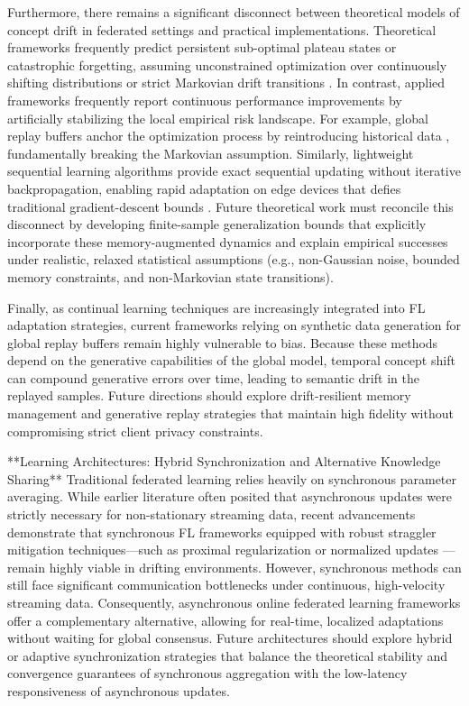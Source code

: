 \documentclass[journal]{IEEEtran}
\begin{document}
Furthermore, there remains a significant disconnect between theoretical models of concept drift in federated settings and practical implementations. Theoretical frameworks frequently predict persistent sub-optimal plateau states or catastrophic forgetting, assuming unconstrained optimization over continuously shifting distributions or strict Markovian drift transitions \cite{Straat2018}. In contrast, applied frameworks frequently report continuous performance improvements by artificially stabilizing the local empirical risk landscape. For example, global replay buffers anchor the optimization process by reintroducing historical data \cite{Miao2025}, fundamentally breaking the Markovian assumption. Similarly, lightweight sequential learning algorithms provide exact sequential updating without iterative backpropagation, enabling rapid adaptation on edge devices that defies traditional gradient-descent bounds \cite{Ito2021}. Future theoretical work must reconcile this disconnect by developing finite-sample generalization bounds that explicitly incorporate these memory-augmented dynamics and explain empirical successes under realistic, relaxed statistical assumptions (e.g., non-Gaussian noise, bounded memory constraints, and non-Markovian state transitions). 

Finally, as continual learning techniques are increasingly integrated into FL adaptation strategies, current frameworks relying on synthetic data generation for global replay buffers \cite{Miao2025} remain highly vulnerable to bias. Because these methods depend on the generative capabilities of the global model, temporal concept shift can compound generative errors over time, leading to semantic drift in the replayed samples. Future directions should explore drift-resilient memory management and generative replay strategies that maintain high fidelity without compromising strict client privacy constraints.

**Learning Architectures: Hybrid Synchronization and Alternative Knowledge Sharing**
Traditional federated learning relies heavily on synchronous parameter averaging. While earlier literature often posited that asynchronous updates were strictly necessary for non-stationary streaming data, recent advancements demonstrate that synchronous FL frameworks equipped with robust straggler mitigation techniques—such as proximal regularization \cite{paper882} or normalized updates \cite{paper883}—remain highly viable in drifting environments. However, synchronous methods can still face significant communication bottlenecks under continuous, high-velocity streaming data. Consequently, asynchronous online federated learning frameworks \cite{Chen2020} offer a complementary alternative, allowing for real-time, localized adaptations without waiting for global consensus. Future architectures should explore hybrid or adaptive synchronization strategies that balance the theoretical stability and convergence guarantees of synchronous aggregation with the low-latency responsiveness of asynchronous updates. 
\end{document}
